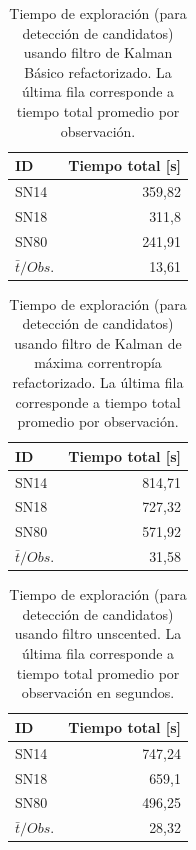 \begin{table}[h!]
\centering
\caption{Tiempo de exploraci\'on (para detecci\'on de candidatos) usando filtro de Kalman B\'asico refactorizado. La \'ultima fila corresponde a tiempo total promedio por observaci\'on.}
\begin{tabular}{|l|r|}
\hline
\textbf{ID} & \textbf{Tiempo total [s]} \\ \hline
\hline
SN14  & 359,82 \\\hline
SN18  & 311,8\\\hline
SN80  & 241,91 \\\hline\hline
 $\bar{t}/Obs. $& 13,61 \\\hline 
\end{tabular}
\label{tab:t8}
\end{table}


\begin{table}[h!]
\centering
\caption{Tiempo de exploraci\'on (para detecci\'on de candidatos) usando filtro de Kalman de m\'axima correntrop\'ia refactorizado. La \'ultima fila corresponde a tiempo total promedio por observaci\'on.}
\begin{tabular}{|l|r|}
\hline
\textbf{ID} & \textbf{Tiempo total [s]} \\ \hline
\hline
SN14  & 814,71 \\\hline
SN18  & 727,32\\\hline
SN80  & 571,92 \\\hline\hline
 $\bar{t}/Obs. $& 31,58 \\\hline 
\end{tabular}
\label{tab:t10}
\end{table}

\begin{table}[h!]
\centering
\caption{Tiempo de exploraci\'on (para detecci\'on de candidatos) usando filtro unscented. La \'ultima fila corresponde a tiempo total promedio por observaci\'on en segundos.}
\begin{tabular}{|l|r|}
\hline
\textbf{ID} & \textbf{Tiempo total [s]} \\ \hline
\hline
SN14  & 747,24 \\\hline
SN18  & 659,1\\\hline
SN80  & 496,25 \\\hline\hline
 $\bar{t}/Obs. $& 28,32 \\\hline 
\end{tabular}
\label{tab:t12}
\end{table}

